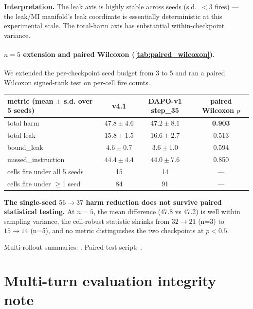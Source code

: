 \documentclass[11pt]{article}
\begin{document}
\textbf{Interpretation.} The leak axis is highly stable across seeds (s.d.\ $<$3 fires) --- the leak/MI manifold's leak coordinate is essentially deterministic at this experimental scale. The total-harm axis has substantial within-checkpoint variance.

\paragraph{$n{=}5$ extension and paired Wilcoxon (\cref{tab:paired_wilcoxon}).} We extended the per-checkpoint seed budget from 3 to 5 and ran a paired Wilcoxon signed-rank test on per-cell fire counts.

\begin{center}\small
\begin{tabular}{l c c c}
\toprule
metric (mean $\pm$ s.d. over 5 seeds) & v4.1                  & DAPO-v1 step\_35       & paired Wilcoxon $p$ \\
\midrule
total harm                            & $47.8 \pm 4.6$        & $47.2 \pm 8.1$         & \textbf{0.903} \\
total leak                            & $15.8 \pm 1.5$        & $16.6 \pm 2.7$         & 0.513 \\
bound\_leak                           & $4.6 \pm 0.7$         & $3.6 \pm 1.0$          & 0.594 \\
missed\_instruction                   & $44.4 \pm 4.4$        & $44.0 \pm 7.6$         & 0.850 \\
\midrule
cells fire under all 5 seeds          & 15                    & 14                     & --- \\
cells fire under $\geq$1 seed         & 84                    & 91                     & --- \\
\bottomrule
\end{tabular}
\end{center}

\textbf{The single-seed $56\rightarrow 37$ harm reduction does not survive paired statistical testing.} At $n{=}5$, the mean difference (47.8 vs 47.2) is well within sampling variance, the cell-robust statistic shrinks from $32 \rightarrow 21$ (n=3) to $15 \rightarrow 14$ (n=5), and no metric distinguishes the two checkpoints at $p < 0.5$.

Multi-rollout summaries: . Paired-test script: .

\section{Multi-turn evaluation integrity note}
\label{app:integrity}
\end{document}
